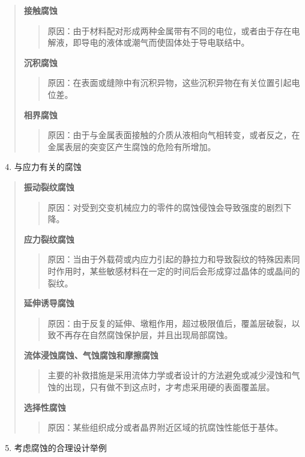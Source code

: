 \documentclass[letterpaper,10pt,english]{sphinxmanual}
\begin{document}
\begin{quote}

\textbf{接触腐蚀}
\begin{quote}

原因：由于材料配对形成两种金属带有不同的电位，或者由于存在电解液，即导电的液体或潮气而使固体处于导电联结中。
\end{quote}

\textbf{沉积腐蚀}
\begin{quote}

原因：在表面或缝隙中有沉积异物，这些沉积异物在有关位置引起电位差。
\end{quote}

\textbf{相界腐蚀}
\begin{quote}

原因：由于与金属表面接触的介质从液相向气相转变，或者反之，在金属表层的突变区产生腐蚀的危险有所增加。
\end{quote}
\end{quote}
\begin{enumerate}
\setcounter{enumi}{3}
\item {} 
与应力有关的腐蚀

\end{enumerate}
\begin{quote}

\textbf{振动裂纹腐蚀}
\begin{quote}

原因：对受到交变机械应力的零件的腐蚀侵蚀会导致强度的剧烈下降。
\end{quote}

\textbf{应力裂纹腐蚀}
\begin{quote}

原因：当由于外载荷或内应力引起的静拉力和导致裂纹的特殊因素同时作用时，某些敏感材料在一定的时间后会形成穿过晶体的或晶间的裂纹。
\end{quote}

\textbf{延伸诱导腐蚀}
\begin{quote}

原因：由于反复的延伸、墩粗作用，超过极限值后，覆盖层破裂，以致不再存在自然腐蚀保护层，并且出现局部腐蚀。
\end{quote}

\textbf{流体浸蚀腐蚀、气蚀腐蚀和摩擦腐蚀}
\begin{quote}

主要的补救措施是采用流体力学或者设计的方法避免或减少浸蚀和气蚀的出现，只有做不到这点时，才考虑采用硬的表面覆盖层。
\end{quote}

\textbf{选择性腐蚀}
\begin{quote}

原因：某些组织成分或者晶界附近区域的抗腐蚀性能低于基体。
\end{quote}
\end{quote}
\begin{enumerate}
\setcounter{enumi}{4}
\item {} 
考虑腐蚀的合理设计举例

\end{enumerate}
\end{document}

